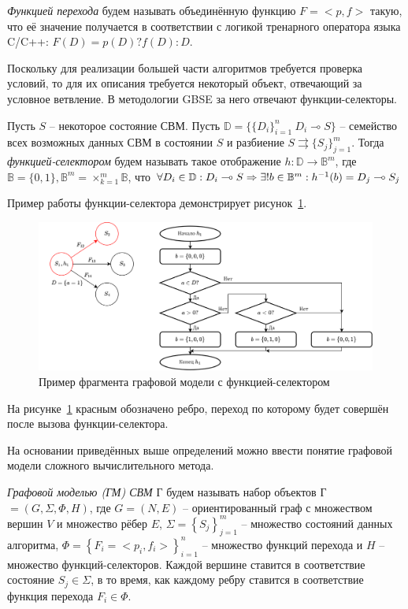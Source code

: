 \begin{definition}
    \emph{Функцией перехода} будем называть объединённую функцию $F = <p,f>$ такую, что её значение получается в соответствии с логикой тренарного оператора языка C/C++: $F(D) = p(D) ? f(D): D$.
\end{definition}

Поскольку для реализации большей части алгоритмов требуется проверка условий, то для их описания требуется некоторый объект, отвечающий за условное ветвление. В методологии GBSE за него отвечают функции-селекторы.

\begin{definition}
    Пусть $S$ -- некоторое состояние СВМ. Пусть $\mathbb{D}=\{\{D_i\}^n_{i=1}\:D_i \multimap S\}$ -- семейство всех возможных данных СВМ в состоянии $S$ и разбиение $S \rightrightarrows \{S_j\}^m_{j=1}$. Тогда \emph{функцией-селектором} будем называть такое отображение $h : \mathbb{D} \rightarrow \mathbb{B}^m$, где $\mathbb{B} = \{0, 1\}, \mathbb{B}^m=\times^m_{k=1}\mathbb{B}$, что $\forall D_i \in \mathbb{D} : D_i \multimap S \Rightarrow \exists!\boldmath{b}\in \mathbb{B}^m: h^{-1}(\boldmath{b})=D_j \multimap S_j$
\end{definition}

Пример работы функции-селектора демонстрирует рисунок~\ref{fig:graphSelector}.

\begin{figure}[H]
    \centering
    \includegraphics[width=\textwidth]{figures/example.selector.png}
    \caption{Пример фрагмента графовой модели с функцией-селектором}
    \label{fig:graphSelector}
\end{figure}

На рисунке~\ref{fig:graphSelector} красным обозначено ребро, переход по которому будет совершён после вызова функции-селектора.

На основании приведённых выше определений можно ввести понятие графовой модели сложного вычислительного метода.
\begin{definition}
    \emph{Графовой моделью (ГМ) СВМ} Г будем называть набор объектов Г$=(G, \Sigma, \Phi, H)$, где $G=(N, E)$ -- ориентированный граф с множеством вершин $V$ и множество рёбер $E$, $\Sigma=\left\{S_j\right\}^m_{j=1}$ -- множество состояний данных алгоритма, $\Phi=\left\{F_i=<p_i, f_i>\right\}^n_{i=1}$ -- множество функций перехода и $H$ -- множество функций-селекторов. Каждой вершине ставится в соответствие состояние $S_j\in\Sigma$, в то время, как каждому ребру ставится в соответствие функция перехода $F_i\in\Phi$.
\end{definition}

